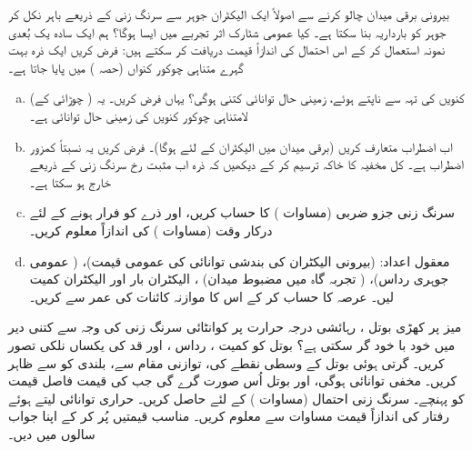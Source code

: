  بیرونی برقی میدان چالو کرنے سے اصولاً  ایک الیکٹران جوہر سے سرنگ زنی کے ذریعے باہر نکل کر جوہر کو بارداریہ بنا سکتا ہے۔   کیا  عمومی شٹارک اثر  تجربے  میں ایسا ہوگا؟ ہم ایک   سادہ  یک  بُعدی نمونہ استعمال کر کے اس  احتمال کی اندازاً قیمت   دریافت کر سکتے ہیں:  فرض کریں ایک ذرہ  بہت گہرے متناہی چوکور کنواں (حصہ )  میں پایا جاتا ہے۔
\begin{enumerate}[a.]
\item
 کنویں کی تہہ  سے ناپتے ہوئے،   زمینی حال توانائی کتنی  ہوگی؟  یہاں   فرض کریں۔    یہ (  چوڑائی کے)  لامتناہی چوکور کنویں کی زمینی حال توانائی ہے۔
\item
 اب اضطراب  متعارف کریں (برقی میدان  میں  الیکٹران کے لئے  ہوگا)۔ فرض کریں یہ  نسبتاً کمزور اضطراب    ہے۔ کل مخفیہ کا خاکہ ترسیم کر کے دیکھیں کہ ذرہ اب مثبت  رخ سرنگ زنی کے ذریعے خارج ہو سکتا ہے۔
\item
 سرنگ زنی جزو ضربی    (مساوات )  کا حساب کریں،  اور ذرے کو فرار ہونے کے لئے درکار وقت   (مساوات ) کی اندازاً    معلوم کریں۔   
\item
 معقول اعداد:   (بیرونی الیکٹران کی بندشی توانائی کی عمومی قیمت)،   ( عمومی جوہری   رداس)،   ( تجربہ گاہ میں مضبوط میدان) ، الیکٹران بار    اور الیکٹران کمیت     لیں۔ عرصہ  کا حساب کر کے اس کا موازنہ کائنات کی عمر سے  کریں۔
 \end{enumerate}
میز  پر  کھڑی بوتل ، رہائشی درجہ حرارت پر  کوانٹائی سرنگ زنی کی وجہ سے کتنی دیر میں خود با خود گر سکتی ہے؟   بوتل کو کمیت ،  رداس ،  اور قد  کی  یکساں  نلکی تصور کریں۔ گرتی  ہوئی  بوتل کے وسطی نقطے کی،  توازنی مقام  سے،  بلندی کو  سے ظاہر کریں۔ مخفی توانائی  ہوگی، اور بوتل اُس صورت گرے گی جب  کی قیمت فاصل قیمت  کو  پہنچے۔ سرنگ زنی احتمال (مساوات )      کے لئے حاصل کریں۔ حراری توانائی  لیتے ہوئے رفتار کی اندازاً  قیمت  مساوات  سے معلوم کریں۔ مناسب قیمتیں پُر کر کے اپنا جواب سالوں میں دیں۔

